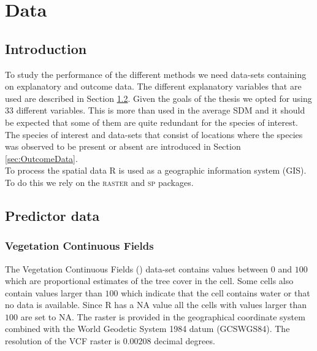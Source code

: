 \chapter{Data}
\label{ch:DataCommonlyUsedInSpeciesDistributionModels}

\section{Introduction}
To study the performance of the different methods we need data-sets containing on explanatory and outcome data. The different explanatory variables that are used are described in Section \ref{sec:PredictorData}. Given the goals of the thesis we opted for using $33$ different variables. This is more than used in the average SDM and it should be expected that some of them are quite redundant for the species of interest. The species of interest and data-sets that consist of locations where the species was observed to be present or absent are introduced in Section \ref{sec:OutcomeData}.  \\

To process the spatial data R \parencite{RProg} is used as a geographic information system (GIS). To do this we rely on the \textsc{raster} \parencite{raster} and \textsc{sp} \parencite{sp} packages.
\section{Predictor data}
\label{sec:PredictorData}

\subsection{Vegetation Continuous Fields}
The Vegetation Continuous Fields () data-set contains values between $0$ and $100$ which are proportional estimates of the tree cover in the cell. Some cells also contain values larger than $100$ which indicate that the cell contains water or that no data is available. Since R has a \textsc{NA} value all the cells with values larger than $100$ are set to \textsc{NA}. The raster is provided in the geographical coordinate system combined with the World Geodetic System 1984 datum (GCS\textunderscore WGS84). The resolution of the VCF raster is $0.00208$ decimal degrees.

